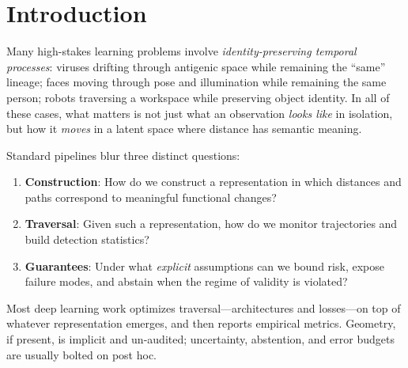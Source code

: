 \documentclass[11pt]{article}
\begin{document}
\begin{abstract}
\emph{Scope}: This manuscript is conceptual. It states definitions, assumptions, theorems,
and proposed empirical protocols (including distortion audits, error-budget estimation,
and abstention monitoring) but does not report retrospective or prospective performance
metrics. Within this scope, Davis manifolds provide a unifying geometric foundation for
identity-preserving temporal detection with explicit regimes of validity, abstention as a
first-class behavior, and compositional error budgets that make failures legible and
falsifiable.
\end{abstract}

\section{Introduction}
\label{sec:intro}

Many high-stakes learning problems involve \emph{identity-preserving temporal processes}: viruses drifting through antigenic space while remaining the ``same'' lineage; faces moving through pose and illumination while remaining the same person; robots traversing a workspace while preserving object identity. In all of these cases, what matters is not just what an observation \emph{looks like} in isolation, but how it \emph{moves} in a latent space where distance has semantic meaning.

Standard pipelines blur three distinct questions:
\begin{enumerate}[leftmargin=*]
    \item \textbf{Construction}: How do we construct a representation in which distances and paths correspond to meaningful functional changes?
    \item \textbf{Traversal}: Given such a representation, how do we monitor trajectories and build detection statistics?
    \item \textbf{Guarantees}: Under what \emph{explicit} assumptions can we bound risk, expose failure modes, and abstain when the regime of validity is violated?
\end{enumerate}
Most deep learning work optimizes traversal---architectures and losses---on top of whatever representation emerges, and then reports empirical metrics. Geometry, if present, is implicit and un-audited; uncertainty, abstention, and error budgets are usually bolted on post hoc.
\end{document}
